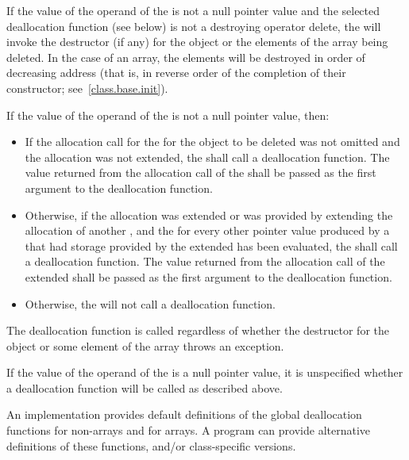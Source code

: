 \pnum
{}%
If the value of the operand of the  is not a
null pointer value
and the selected deallocation function (see below)
is not a destroying operator delete,
the  will invoke the
destructor (if any) for the object or the elements of the array being
deleted. In the case of an array, the elements will be destroyed in
order of decreasing address (that is, in reverse order of the completion
of their constructor; see~\ref{class.base.init}).

\pnum
If the value of the operand of the  is not a
null pointer value, then:

\begin{itemize}
\item
If the allocation call for the  for the object to
be deleted was not omitted and the allocation was not extended, the
 shall call a deallocation
function. The value returned from the
allocation call of the  shall be passed as the
first argument to the deallocation function.

\item
Otherwise, if the allocation was extended or was provided by extending the
allocation of another , and the
 for every other pointer value produced by a
 that had storage provided by the extended
 has been evaluated, the
 shall call a deallocation function. The value
returned from the allocation call of the extended 
shall be passed as the first argument to the deallocation function.

\item
Otherwise, the  will not call a
deallocation function.
\end{itemize}
\begin{note}
The deallocation function is called regardless of whether the destructor
for the object or some element of the array throws an exception.
\end{note}
If the value of the operand of the  is a
null pointer value, it is unspecified whether a deallocation function will be
called as described above.

\pnum
\begin{note}
An implementation provides default definitions of the global
deallocation functions  for
non-arrays and
%
 for arrays. A \Cpp{}
program can provide alternative definitions of these
functions, and/or class-specific
versions.
\end{note}

